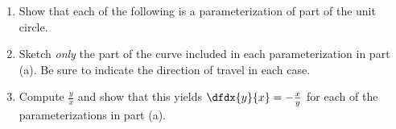   \vskip-3mm{}
\begin{embeddedproblem-enumerate}
  \label{problem:UnitCircleParameterization1}
  \begin{enumerate}[label={\bf{}(\alph*)}]
  \item Show that each of the following is a parameterization of
    part of the unit circle.
    \begin{enumerate}[label={\bf{}(\roman*)}]
    \end{enumerate}
  \item Sketch \emph{only} the part of the curve included in each
    parameterization in part (a).  Be sure to indicate the direction
    of travel in each case.
  \item Compute $\frac{\dot{y}}{\dot{x}}$ and show that this yields
    $\dfdx{y}{x}=-\frac{x}{y}$ for each of the
    parameterizations in part (a).
  \end{enumerate}
\end{embeddedproblem-enumerate}

